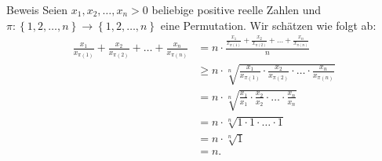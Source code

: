 \documentclass[10pt]{beamer}
\begin{document}
\begin{frame}{Beweis}
    Seien \( x_{1}, x_{2}, \ldots, x_{n} > 0 \) beliebige positive reelle Zahlen und \( \pi: \left\{ 1, 2, \ldots, n \right\} \to \left\{ 1, 2, \ldots, n \right\} \) eine Permutation. Wir schätzen wie folgt ab:
    \begin{align*}
        \frac{x_{1}}{x_{\pi\left( 1 \right)}} + \frac{x_{2}}{x_{\pi\left( 2 \right)}} + \ldots + \frac{x_{n}}{x_{\pi\left( n \right)}}
        & = n \cdot \frac{\frac{x_{1}}{x_{\pi\left( 1 \right)}} + \frac{x_{2}}{x_{\pi\left( 2 \right)}} + \ldots + \frac{x_{n}}{x_{\pi\left( n \right)}}}{n} \\
        & \geq n \cdot \sqrt[n]{\frac{x_{1}}{x_{\pi\left( 1 \right)}} \cdot \frac{x_{2}}{x_{\pi\left( 2 \right)}} \cdot \ldots \cdot \frac{x_{n}}{x_{\pi\left( n \right)}}} \\
        & = n \cdot \sqrt[n]{\frac{x_{1}}{x_{1}} \cdot \frac{x_{2}}{x_{2}} \cdot \ldots \cdot \frac{x_{n}}{x_{n}}} \\
        & = n \cdot \sqrt[n]{1 \cdot 1 \cdot \ldots \cdot 1} \\
        & = n \cdot \sqrt[n]{1} \\
        & = n.
    \end{align*}
\end{frame}







\end{document}
